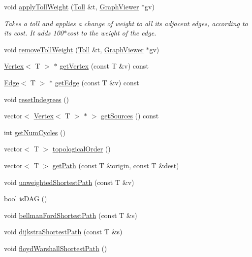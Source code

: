 \begin{DoxyCompactItemize}
\item 
void \hyperlink{class_graph_a7b9a7f15067572593b8be54c59ac1b32}{apply\+Toll\+Weight} (\hyperlink{class_toll}{Toll} \&t, \hyperlink{class_graph_viewer}{Graph\+Viewer} $\ast$gv)
\begin{DoxyCompactList}\small\item\em Takes a toll and applies a change of weight to all its adjacent edges, according to its cost. It adds 100$\ast$cost to the weight of the edge. \end{DoxyCompactList}\item 
void \hyperlink{class_graph_adbb6e61a997bdd22911d5f38361d38bd}{remove\+Toll\+Weight} (\hyperlink{class_toll}{Toll} \&t, \hyperlink{class_graph_viewer}{Graph\+Viewer} $\ast$gv)
\item 
\hyperlink{class_vertex}{Vertex}$<$ T $>$ $\ast$ \hyperlink{class_graph_a08a95472b0d9bd7321660940807af060}{get\+Vertex} (const T \&v) const 
\item 
\hyperlink{class_edge}{Edge}$<$ T $>$ $\ast$ \hyperlink{class_graph_a45b90c42b1fd441a721cb3af43d07f07}{get\+Edge} (const T \&v) const 
\item 
void \hyperlink{class_graph_af34eb86d804272e6e3e221a9ed688c53}{reset\+Indegrees} ()
\item 
vector$<$ \hyperlink{class_vertex}{Vertex}$<$ T $>$ $\ast$ $>$ \hyperlink{class_graph_aa1a3c754f51a888e25dff2b26dfb85fc}{get\+Sources} () const 
\item 
int \hyperlink{class_graph_a694dff81073c38b669057f0c6bd4cbb1}{get\+Num\+Cycles} ()
\item 
vector$<$ T $>$ \hyperlink{class_graph_a2e75512c089c3916dda9cf61e1185d9d}{topological\+Order} ()
\item 
vector$<$ T $>$ \hyperlink{class_graph_ab4054ca572c10669dd3e05d6d41c116c}{get\+Path} (const T \&origin, const T \&dest)
\item 
void \hyperlink{class_graph_ae5264597aacaf4f45819e96a6d6c89aa}{unweighted\+Shortest\+Path} (const T \&v)
\item 
bool \hyperlink{class_graph_ab49d07c2bd6b8b30d5ae82bc558b821a}{is\+D\+A\+G} ()
\item 
void \hyperlink{class_graph_a1d6769b79beaa76f78fd9c9209833bef}{bellman\+Ford\+Shortest\+Path} (const T \&s)
\item 
void \hyperlink{class_graph_a445a38cf4045797198eae2b818b602de}{dijkstra\+Shortest\+Path} (const T \&s)
\item 
void \hyperlink{class_graph_ae5161f4408bf1ead2b29d19d67fb04ee}{floyd\+Warshall\+Shortest\+Path} ()

\end{DoxyCompactItemize}

